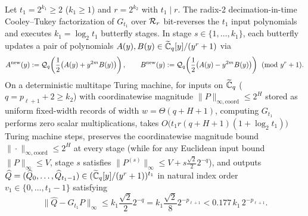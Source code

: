 \begin{lemma}\label{lem:syn-fft}
Let $t_1 = 2^{k_1} \ge 2$ ($k_1 \ge 1$) and $r = 2^{k_2}$ with $t_1 \mid r$. The radix-2 decimation-in-time Cooley--Tukey factorization of $G_{t_1}$ over $\mathcal{R}_r$ bit-reverses the $t_1$ input polynomials and executes $k_1 = \log_2 t_1$ butterfly stages. In stage $s \in \{1, \dots, k_1\}$, each butterfly updates a pair of polynomials $A(y), B(y) \in \widetilde{\mathbb{C}}_q[y]/(y^r + 1)$ via
\[
  A^{\mathrm{new}}(y) := \mathcal{Q}_q\!\left(\frac{1}{2}\bigl(A(y) + y^{2m} B(y)\bigr)\right), \qquad B^{\mathrm{new}}(y) := \mathcal{Q}_q\!\left(\frac{1}{2}\bigl(A(y) - y^{2m} B(y)\bigr)\right) \pmod{y^r + 1}.
\]
On a deterministic multitape Turing machine, for inputs on $\widetilde{\mathbb{C}}_q$ ($q = p_{\ell+1} + 2 \ge k_2$) with coordinatewise magnitude $\|P\|_{\infty,\mathrm{coord}} \le 2^H$ stored as uniform fixed-width records of width $w = \Theta(q + H + 1)$, computing $G_{t_1}$ performs zero scalar multiplications, takes $O\bigl(t_1 r (q + H + 1)(1 + \log_2 t_1)\bigr)$ Turing machine steps, preserves the coordinatewise magnitude bound $\|\cdot\|_{\infty,\mathrm{coord}} \le 2^H$ at every stage (while for any Euclidean input bound $\|P\|_\infty \le V$, stage $s$ satisfies $\|P^{(s)}\|_\infty \le V + s \frac{\sqrt{2}}{2} 2^{-q}$), and outputs $\widehat{Q} = (\widehat{Q}_0, \dots, \widehat{Q}_{t_1-1}) \in (\widetilde{\mathbb{C}}_q[y]/(y^r+1))^{t_1}$ in natural index order $v_1 \in \{0, \dots, t_1-1\}$ satisfying
\begin{equation}\label{eq:syn-err}
  \|\widehat{Q} - G_{t_1} P\|_\infty \le k_1 \frac{\sqrt{2}}{2} 2^{-q} = k_1 \frac{\sqrt{2}}{8} 2^{-p_{\ell+1}} < 0.177 \, k_1 \, 2^{-p_{\ell+1}}.
\end{equation}
\end{lemma}

